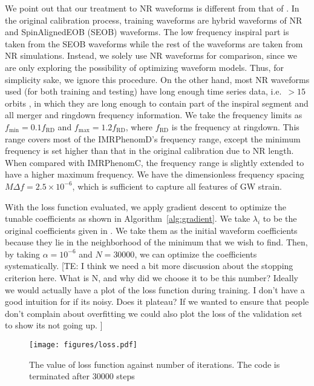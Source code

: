 \documentclass[twocolumn]{aastex631}
\newcommand{\te}[1]{{\color{rr}[TE: #1 ]}}
\begin{document}
We point out that our treatment to NR waveforms is different from that of \citep{husa2016frequency, khan2016frequency}. In the original calibration process, training waveforms are hybrid waveforms of NR and SpinAlignedEOB
(SEOB) waveforms. The low frequency inspiral part is taken from the SEOB
waveforms while the rest of the waveforms are taken from NR simulations.
Instead, we solely use NR waveforms for comparison, since we are only exploring the possibility of optimizing waveform models. Thus, for simplicity sake, we ignore this procedure. On the other hand, most NR waveforms used (for both training and testing) have long enough time series data, i.e.~$>15$ orbits \citep{boyle2019sxs}, in
which they are long enough to contain part of the inspiral segment and all
merger and ringdown frequency information. We take the frequency limits as
$f_{\mathrm{min}}=0.1f_{\mathrm{RD}}$ and $f_{\mathrm{max}}=1.2f_{\mathrm{RD}}$,	%
where $f_{\mathrm{RD}}$ is the frequency at ringdown. This range covers most of
the IMRPhenomD's frequency range, except the minimum frequency is set higher
than that in the original calibration due to NR length. When compared with
IMRPhenomC, the frequency range is slightly extended to have a higher maximum
frequency. We have the dimensionless frequency spacing $M\Delta f=2.5\times10^{-6}$, 
which is sufficient to capture all features of GW strain. 

With the loss function evaluated, we apply gradient descent to optimize the tunable
coefficients as shown in Algorithm~\ref{alg:gradient}. We take $\lambda_i$ to be the 
original coefficients given in \citep{khan2016frequency}. We take them as the initial 
waveform coefficients because they lie in the neighborhood of the minimum that we wish 
to find. Then, by taking $\alpha=10^{-6}$ and $N=30000$, we can optimize the 
coefficients systematically. 
\te{I think we need a bit more discussion about the stopping criterion here. What is N, and why did we choose it to be this number? Ideally we would actually have a plot of the loss function during training. I don't have a good intuition for if its noisy. Does it plateau? If we wanted to ensure that people don't complain about overfitting we could also plot the loss of the validation set to show its not going up.}

\begin{figure}
	\centering
	\texttt{[image: figures/loss.pdf]}
	\caption{The value of loss function against number of iterations. The code is terminated after 30000 steps }
	\label{fig:loss}
\end{figure}
\end{document}
